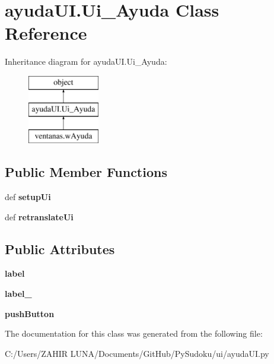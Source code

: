 \hypertarget{classayuda_u_i_1_1_ui___ayuda}{\section{ayuda\-U\-I.\-Ui\-\_\-\-Ayuda Class Reference}
\label{classayuda_u_i_1_1_ui___ayuda}
}
Inheritance diagram for ayuda\-U\-I.\-Ui\-\_\-\-Ayuda\-:\begin{figure}[H]
\begin{center}
\leavevmode
\includegraphics[height=3.000000cm]{classayuda_u_i_1_1_ui___ayuda}
\end{center}
\end{figure}
\subsection*{Public Member Functions}
\begin{DoxyCompactItemize}
\item 
\hypertarget{classayuda_u_i_1_1_ui___ayuda_a616863ea29f44f7f52d368e09f480753}{def {\bfseries setup\-Ui}}\label{classayuda_u_i_1_1_ui___ayuda_a616863ea29f44f7f52d368e09f480753}

\item 
\hypertarget{classayuda_u_i_1_1_ui___ayuda_a9eff96f141f61c51614d817a9a0f16a7}{def {\bfseries retranslate\-Ui}}\label{classayuda_u_i_1_1_ui___ayuda_a9eff96f141f61c51614d817a9a0f16a7}

\end{DoxyCompactItemize}
\subsection*{Public Attributes}
\begin{DoxyCompactItemize}
\item 
\hypertarget{classayuda_u_i_1_1_ui___ayuda_a2b56f75a292ff08c862a23b55b60525c}{{\bfseries label}}\label{classayuda_u_i_1_1_ui___ayuda_a2b56f75a292ff08c862a23b55b60525c}

\item 
\hypertarget{classayuda_u_i_1_1_ui___ayuda_afe089ef2b986a612644064f9a178c3c5}{{\bfseries label\-\_}}\label{classayuda_u_i_1_1_ui___ayuda_afe089ef2b986a612644064f9a178c3c5}

\item 
\hypertarget{classayuda_u_i_1_1_ui___ayuda_ac4a0b3f55d0bd9996436e79857e8e8d9}{{\bfseries push\-Button}}\label{classayuda_u_i_1_1_ui___ayuda_ac4a0b3f55d0bd9996436e79857e8e8d9}

\end{DoxyCompactItemize}


The documentation for this class was generated from the following file\-:\begin{DoxyCompactItemize}
\item 
C\-:/\-Users/\-Z\-A\-H\-I\-R  L\-U\-N\-A/\-Documents/\-Git\-Hub/\-Py\-Sudoku/ui/ayuda\-U\-I.\-py\end{DoxyCompactItemize}
